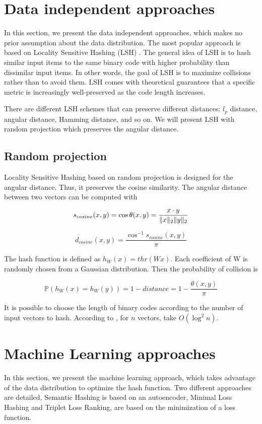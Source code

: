 \section{Data independent approaches}
In this section, we present the data independent approaches, which makes no prior assumption about the data distribution. The most popular approach is based on Locality Sensitive Hashing (LSH) \cite{wang2014hashing}. The general idea of LSH is to hash similar input items to the same binary code with higher probability than dissimilar input items. In other words, the goal of LSH is to maximize collisions rather than to avoid them. LSH comes with theoretical guarantees that a specific metric is increasingly well-preserved as the code length increases.

There are different LSH schemes that can preserve different distances: $l_p$ distance, angular distance, Hamming distance, and so on. We will present LSH with random projection which preserves the angular distance.

\subsection{Random projection}
Locality Sensitive Hashing based on random projection \cite{charikar2002similarity} is designed for the angular distance. Thus, it preserves the cosine similarity. The angular distance between two vectors can be computed with

\[s_{cosine}(x, y)=\cos{\theta{}(x, y)}=\frac{x\cdot{}y}{\lVert x\rVert_2\lVert y\rVert_2}\]

\[d_{cosine}(x, y)=\frac{\cos^{-1}s_{cosine}(x, y)}{\pi}\]

The hash function is defined as $h_W(x)=thr(Wx)$. Each coefficient of W is randomly chosen from a Gaussian distribution. Then the probability of collision is 

\[\mathbb{P}(h_W(x)=h_W(y))=1-distance=1-\frac{\theta{}(x, y)}{\pi}\]

It is possible to choose the length of binary codes according to the number of input vectors to hash. According to \cite{wang2014hashing}, for $n$ vectors, take $O(\log^2{n})$.

\section{Machine Learning approaches}
In this section, we present the machine learning approach, which takes advantage of the data distribution to optimize the hash function. Two different approaches are detailed, Semantic Hashing is based on an autoencoder, Minimal Loss Hashing and Triplet Loss Ranking, are based on the minimization of a loss function.

